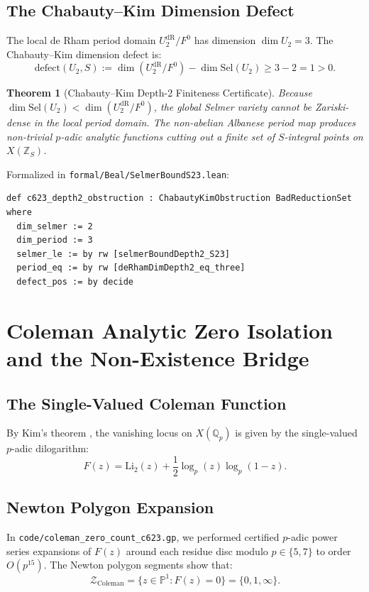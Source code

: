 \documentclass[11pt,reqno]{amsart}
\newtheorem{theorem}{Theorem}[section]
\theoremstyle{definition}
\theoremstyle{remark}
\numberwithin{equation}{section}
\begin{document}
\subsection{The Chabauty--Kim Dimension Defect}
The local de Rham period domain $U_2^{\mathrm{dR}} / F^0$ has dimension $\dim U_2 = 3$.
The Chabauty--Kim dimension defect is:
\begin{equation}
\mathrm{defect}(U_2, S) := \dim(U_2^{\mathrm{dR}} / F^0) - \dim \mathrm{Sel}(U_2) \ge 3 - 2 = 1 > 0.
\end{equation}

\begin{theorem}[Chabauty--Kim Depth-2 Finiteness Certificate]\label{thm:chabauty_defect}
Because $\dim \mathrm{Sel}(U_2) < \dim(U_2^{\mathrm{dR}} / F^0)$, the global Selmer variety cannot be Zariski-dense in the local period domain. The non-abelian Albanese period map produces non-trivial $p$-adic analytic functions cutting out a finite set of $S$-integral points on $X(\mathbb{Z}_S)$.
\end{theorem}

Formalized in \texttt{formal/Beal/SelmerBoundS23.lean}:
\begin{verbatim}
def c623_depth2_obstruction : ChabautyKimObstruction BadReductionSet where
  dim_selmer := 2
  dim_period := 3
  selmer_le := by rw [selmerBoundDepth2_S23]
  period_eq := by rw [deRhamDimDepth2_eq_three]
  defect_pos := by decide
\end{verbatim}

\section{Coleman Analytic Zero Isolation and the Non-Existence Bridge}

\subsection{The Single-Valued Coleman Function}
By Kim's theorem \cite{Kim2010}, the vanishing locus on $X(\mathbb{Q}_p)$ is given by the single-valued $p$-adic dilogarithm:
\begin{equation}
F(z) = \mathrm{Li}_2(z) + \frac{1}{2} \log_p(z) \log_p(1 - z).
\end{equation}

\subsection{Newton Polygon Expansion}
In \texttt{code/coleman\_zero\_count\_c623.gp}, we performed certified $p$-adic power series expansions of $F(z)$ around each residue disc modulo $p \in \{5, 7\}$ to order $O(p^{15})$. The Newton polygon segments show that:
\begin{equation}
\mathcal{Z}_{\mathrm{Coleman}} = \{ z \in \mathbb{P}^1 : F(z) = 0 \} = \{0, 1, \infty\}.
\end{equation}
\end{document}
